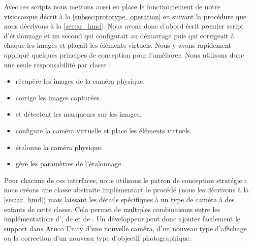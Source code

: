 Avec ces scripts nous mettons aussi en place le fonctionnement de notre visiocasque décrit à la \autoref{subsec:prototype_operation} en suivant la procédure que nous décrivons à la \autoref{sec:ar_hmd}. Nous avons donc d'abord écrit premier script d'étalonnage et un second qui configurait au démarrage puis qui corrigeait à chaque  les images et plaçait les éléments virtuels. Nous y avons rapidement appliqué quelques principes de conception pour l'améliorer. Nous utilisons donc une seule responsabilité par classe  :
\begin{itemize}
  \item {} récupère les images de la caméra physique.
  \item {} corrige les images capturées.
  \item {} et  détectent les marqueurs sur les images.
  \item {} configure la caméra virtuelle et place les éléments virtuels.
  \item {} étalonne la caméra physique.
  \item {} gère les paramètres de l'étalonnage.
\end{itemize}
\medskip

Pour chacune de ces interfaces, nous utilisons le patron de conception stratégie : nous créons une classe abstraite implémentant le procédé (nous les décrivons à la \autoref{sec:ar_hmd}) mais laissant les détails spécifiques à un type de caméra à des enfants de cette classe. Cela permet de multiples combinaisons entre les implémentations d', de  et de . Un développeur peut donc ajouter facilement le support dans Aruco Unity d'une nouvelle caméra, d'un nouveau type d'affichage ou la correction d'un nouveau type d'objectif photographique.

